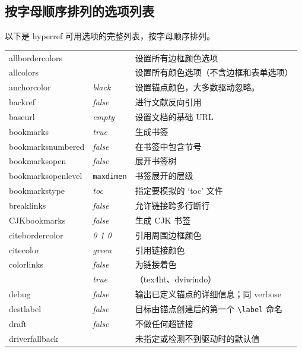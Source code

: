 \documentclass{article}
\newcommand*{\xpackage}[1]{\textsf{#1}}
\newcommand{\bs}{\symbol{'134}}%
\newcommand{\ci}[1]{\texttt{\bs#1}}
\begin{document}
\subsection{按字母顺序排列的选项列表}

以下是 \xpackage{hyperref} 可用选项的完整列表，按字母顺序排列。

\begin{longtable}{@{}>{\ttfamily}llp{7cm}@{}}
allbordercolors    &                        & 设置所有边框颜色选项\\
allcolors          &                        & 设置所有颜色选项（不含边框和表单选项）\\
anchorcolor        & \textit{black}         & 设置锚点颜色，大多数驱动忽略。\\
backref            & \textit{false}         & 进行文献反向引用\\
baseurl            & \textit{empty}         & 设置文档的基础 URL\\
bookmarks          & \textit{true}          & 生成书签\\
bookmarksnumbered  & \textit{false}         & 在书签中包含节号\\
bookmarksopen      & \textit{false}         & 展开书签树\\
bookmarksopenlevel & \ttfamily\ci{maxdimen} & 书签展开的层级\\
bookmarkstype      & \textit{toc}           & 指定要模拟的 `toc' 文件\\
breaklinks         & \textit{false}         & 允许链接跨多行断行\\
CJKbookmarks       & \textit{false}         & 生成 CJK 书签\\
citebordercolor    & \textit{0 1 0}         & 引用周围边框颜色\\
citecolor          & \textit{green}         & 引用链接颜色\\
colorlinks         & \textit{false}         & 为链接着色\\
                   & \textit{true}          & （\textsf{tex4ht}、\textsf{dviwindo}）\\
debug              & \textit{false}         & 输出已定义锚点的详细信息；同 verbose\\
destlabel          & \textit{false}         & 目标由锚点创建后的第一个 \verb|\label| 命名\\
draft              & \textit{false}         & 不做任何超链接\\
driverfallback     &                        & 未指定或检测不到驱动时的默认值\\

\end{longtable}
\end{document}

